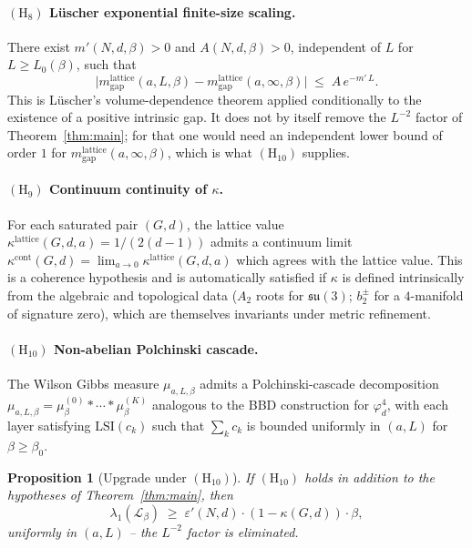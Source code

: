 \documentclass[11pt,reqno]{amsart}
\theoremstyle{plain}
\newtheorem{proposition}[theorem]{Proposition}
\theoremstyle{definition}
\theoremstyle{remark}
\newcommand{\calL}{\mathcal{L}}
\begin{document}
\paragraph{$(\mathrm{H}_8)$ L\"uscher exponential finite-size scaling.}
There exist $m'(N, d, \beta) > 0$ and $A(N, d, \beta) > 0$, independent of $L$ for $L \ge L_0(\beta)$, such that
\[
  \bigl| m^{\mathrm{lattice}}_{\mathrm{gap}}(a, L, \beta) - m^{\mathrm{lattice}}_{\mathrm{gap}}(a, \infty, \beta) \bigr| \;\le\; A \, e^{- m' \, L}.
\]
This is L\"uscher's volume-dependence theorem \cite{Luscher1986} applied conditionally to the existence of a positive intrinsic gap. It does not by itself remove the $L^{-2}$ factor of Theorem~\ref{thm:main}; for that one would need an independent lower bound of order $1$ for $m^{\mathrm{lattice}}_{\mathrm{gap}}(a, \infty, \beta)$, which is what $(\mathrm{H}_{10})$ supplies.

\paragraph{$(\mathrm{H}_9)$ Continuum continuity of $\kappa$.}
For each saturated pair $(G, d)$, the lattice value $\kappa^{\mathrm{lattice}}(G, d, a) = 1/(2(d-1))$ admits a continuum limit $\kappa^{\mathrm{cont}}(G, d) = \lim_{a \to 0} \kappa^{\mathrm{lattice}}(G, d, a)$ which agrees with the lattice value. This is a coherence hypothesis and is automatically satisfied if $\kappa$ is defined intrinsically from the algebraic and topological data ($A_2$ roots for $\mathfrak{su}(3)$; $b_2^\pm$ for a $4$-manifold of signature zero), which are themselves invariants under metric refinement.

\paragraph{$(\mathrm{H}_{10})$ Non-abelian Polchinski cascade.}
The Wilson Gibbs measure $\mu_{a, L, \beta}$ admits a Polchinski-cascade decomposition $\mu_{a, L, \beta} = \mu_\beta^{(0)} \ast \cdots \ast \mu_\beta^{(K)}$ analogous to the BBD construction \cite{BD22, BBD24} for $\varphi^4_d$, with each layer satisfying $\mathrm{LSI}(c_k)$ such that $\sum_k c_k$ is bounded uniformly in $(a, L)$ for $\beta \ge \beta_0$.

\begin{proposition}[Upgrade under $(\mathrm{H}_{10})$]
\label{prop:upgrade-H10}
If $(\mathrm{H}_{10})$ holds in addition to the hypotheses of Theorem~\ref{thm:main}, then
\[
  \lambda_1(\calL_\beta) \;\ge\; \varepsilon'(N, d) \cdot (1 - \kappa(G, d)) \cdot \beta,
\]
uniformly in $(a, L)$ -- the $L^{-2}$ factor is eliminated.
\end{proposition}
\end{document}
